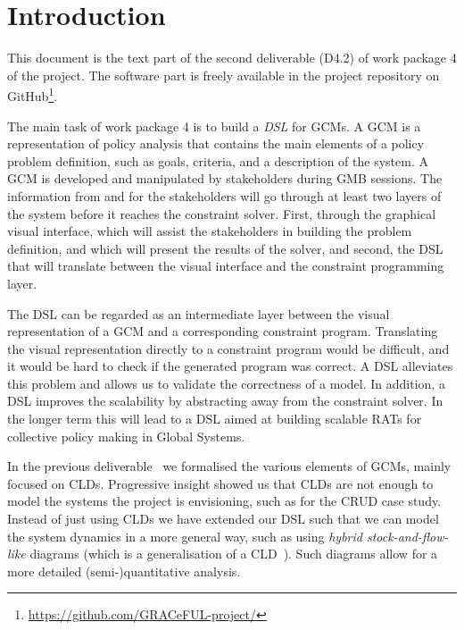 \section{Introduction}\label{introduction}

This document is the text part of the second deliverable (D4.2) of
work package 4 of the \grace project.
%
The software part is freely available in the project repository on
GitHub\footnote{\url{https://github.com/GRACeFUL-project/}}.

The main task of work package 4 is to build a \emph{\ac{DSL}} for
\acp{GCM}.
%
A \ac{GCM} is a representation of policy analysis that contains the
main elements of a policy problem definition, such as goals, criteria,
and a description of the system.
%
A \ac{GCM} is developed and manipulated by stakeholders during
\ac{GMB} sessions.
%
The information from and for the stakeholders will go through at least
two layers of the \grace system before it reaches the constraint
solver.
%
First, through the graphical visual interface, which will assist the
stakeholders in building the problem definition, and which will
present the results of the solver, and second, the \ac{DSL} that
will translate between the visual interface and the constraint
programming layer.

The \ac{DSL} can be regarded as an intermediate layer between the
visual representation of a \acf{GCM} and a corresponding constraint
program.
%
Translating the visual representation directly to a constraint program
would be difficult, and it would be hard to check if the generated
program was correct.
%
A DSL alleviates this problem and allows us to validate the
correctness of a model.
%
In addition, a \ac{DSL} improves the scalability by abstracting away
from the constraint solver.
%
In the longer term this will lead to a \ac{DSL} aimed at building
scalable \acp{RAT} for collective policy making in Global Systems.


In the previous deliverable~\cite{D4.1} we formalised the various
elements of \acp{GCM}, mainly focused on \acp{CLD}.
%
Progressive insight showed us that \acp{CLD} are not enough to model
the systems the project is envisioning, such as for the \ac{CRUD} case
study.
%
Instead of just using \aclp{CLD} we have extended our \ac{DSL} such
that we can model the system dynamics in a more general way, such as
using \emph{hybrid stock-and-flow-like} diagrams (which is
a generalisation of a \ac{CLD}~\cite{burns}).
%
Such diagrams allow for a more detailed (semi-)quantitative
analysis.

